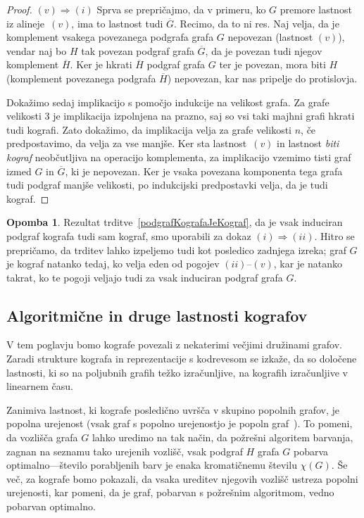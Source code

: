 \documentclass[12pt,a4paper,twoside]{article}
\theoremstyle{definition} %
\newtheorem{opomba}[definicija]{Opomba}
\theoremstyle{plain} %
\numberwithin{equation}{section}  %
\begin{document}
\begin{proof}
\medskip
$(v) \Rightarrow (i)$ Sprva se prepričajmo, da v primeru, ko $G$ premore lastnost iz alineje~$(v)$, ima to lastnost tudi $\overline{G}$. Recimo, da to ni res. Naj velja, da je komplement vsakega povezanega podgrafa grafa $G$ nepovezan (lastnost $(v)$), vendar naj bo $H$ tak povezan podgraf grafa $\overline{G}$, da je povezan tudi njegov komplement $\overline{H}$. Ker je hkrati $\overline{H}$ podgraf grafa $G$ ter je povezan, mora biti $H$ (komplement povezanega podgrafa $\overline{H}$) nepovezan, kar nas pripelje do protislovja.

\medskip
Dokažimo sedaj implikacijo s pomočjo indukcije na velikost grafa. Za grafe velikosti 3 je implikacija izpolnjena na prazno, saj so vsi taki majhni grafi hkrati tudi kografi. Zato dokažimo, da implikacija velja za grafe velikosti $n$, če predpostavimo, da velja za vse manjše. Ker sta lastnost~$(v)$ in lastnost \textit{biti kograf} neobčutljiva na operacijo komplementa, za implikacijo vzemimo tisti graf izmed $G$ in $\overline{G}$, ki je nepovezan. Ker je vsaka povezana komponenta tega grafa tudi podgraf manjše velikosti, po indukcijski predpostavki velja, da je tudi kograf.\end{proof}

\begin{opomba}
Rezultat trditve~\ref{podgrafKografaJeKograf}, da je vsak induciran podgraf kografa tudi sam kograf, smo uporabili za dokaz $(i) \Rightarrow (ii)$. Hitro se prepričamo, da trditev lahko izpeljemo tudi kot posledico zadnjega izreka; graf $G$ je kograf natanko tedaj, ko velja eden od pogojev $(ii)$--$(v)$, kar je natanko takrat, ko te pogoji veljajo tudi za vsak induciran podgraf grafa $G$.
\end{opomba}

\subsection{Algoritmične in druge lastnosti kografov}\label{sec:algoritmicneInDrugeLastnosti}
V tem poglavju bomo kografe povezali z nekaterimi večjimi družinami grafov. Zaradi strukture kografa in reprezentacije s kodrevesom se izkaže, da so določene lastnosti, ki so na poljubnih grafih težko izračunljive, na kografih izračunljive v linearnem času.

Zanimiva lastnost, ki kografe posledično uvršča v skupino popolnih grafov,  je popolna urejenost (vsak graf s popolno urejenostjo je popoln graf~\cite{maffray2003coloration}). To pomeni, da vozlišča grafa $G$ lahko uredimo na tak način, da požrešni algoritem barvanja, zagnan na seznamu tako urejenih vozlišč, vsak podgraf $H$ grafa $G$ pobarva optimalno---število porabljenih barv je enaka kromatičnemu številu $\chi(G)$. Še več, za kografe bomo pokazali, da vsaka ureditev njegovih vozlišč ustreza popolni urejenosti, kar pomeni, da je graf, pobarvan s požrešnim algoritmom, vedno pobarvan optimalno.
\end{document}

